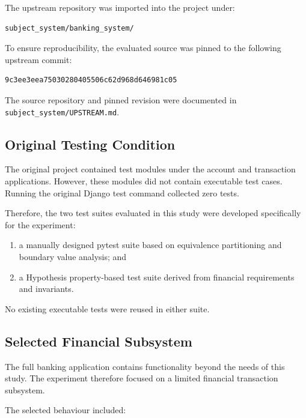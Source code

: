 \documentclass[12pt]{article}
\begin{document}
The upstream repository was imported into the project under:

\begin{verbatim}
subject_system/banking_system/
\end{verbatim}

To ensure reproducibility, the evaluated source was pinned to the following
upstream commit:

\begin{verbatim}
9c3ee3eea75030280405506c62d968d646981c05
\end{verbatim}

The source repository and pinned revision were documented in
\texttt{subject\_system/UPSTREAM.md}.

\subsection{Original Testing Condition}

The original project contained test modules under the account and transaction
applications. However, these modules did not contain executable test cases.
Running the original Django test command collected zero tests.

Therefore, the two test suites evaluated in this study were developed
specifically for the experiment:

\begin{enumerate}
    \item a manually designed pytest suite based on equivalence partitioning
          and boundary value analysis; and
    \item a Hypothesis property-based test suite derived from financial
          requirements and invariants.
\end{enumerate}

No existing executable tests were reused in either suite.

\subsection{Selected Financial Subsystem}

The full banking application contains functionality beyond the needs of this
study. The experiment therefore focused on a limited financial transaction
subsystem.

The selected behaviour included:
\end{document}
